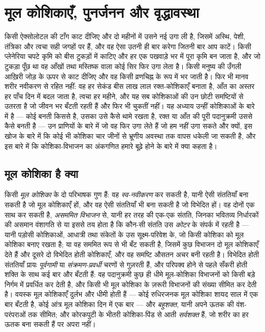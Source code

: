 \chapter{मूल कोशिकाएँ, पुनर्जनन और वृद्धावस्था}\label{ch:b3:stem-cells}

किसी ऐक्सोलोटल की टाँग काट दीजिए और दो महीनों में उसने नई उगा ली है,
जिसमें अस्थि, पेशी, तंत्रिका और त्वचा सही जगहों पर हैं, और वह ऐसा उतनी
ही बार करेगा जितनी बार आप काटें। किसी प्लेनेरिया चपटे कृमि को बीस
टुकड़ों में काटिए और हर एक पखवाड़े भर में पूरा कृमि बन जाता है, और जो
टुकड़ा पूँछ था वह आँखों तथा मस्तिष्क वाला कोई सिर फिर उगा लेता है। किसी
मनुष्य की उँगली आख़िरी जोड़ के ऊपर से काट दीजिए और वह किसी व्रणचिह्न के
रूप में भर जाती है। फिर भी मानव शरीर नवीकरण से रहित नहीं: वह हर सेकंड
बीस लाख लाल रक्त-कोशिकाएँ बनाता है, आँत का अस्तर हर पाँच दिन में बदल
जाता है, त्वचा हर महीने, और यह सब कोशिकाओं की उन छोटी समष्टियों से उतरता
है जो जीवन भर बँटती रहती हैं और फिर भी चुकतीं नहीं। यह अध्याय उन्हीं
कोशिकाओं के बारे में है --- कोई  बनती किससे है, उसका  उसे
कैसे थामे रखता है, रक्त या आँत की पूरी पदानुक्रमी उससे कैसे बनती है ---
उन प्राणियों के बारे में जो वह फिर उगा लेते हैं जो हम नहीं उगा सकते और
क्यों, इस खोज के बारे में कि कोई भी कोशिका चार जीनों से भ्रूणीय अवस्था
तक वापस धकेली जा सकती है, और इस बारे में कि कोशिका-विभाजन का अंकगणित
हमारे बूढ़े होने के बारे में क्या कहता है।

\section{मूल कोशिका है क्या}

\begin{definition}[मूल कोशिकाएँ और उनकी पदानुक्रमी]\label{def:b3:stem-cells:stem}
किसी \emph{मूल कोशिका} के दो परिभाषक गुण हैं: वह \emph{स्व-नवीकरण} कर
सकती है, यानी ऐसी संततियाँ बना सकती है जो मूल कोशिकाएँ हों, और वह ऐसी
संततियाँ भी बना सकती है जो विभेदित हों। वह दोनों एक साथ कर सकती है,
\emph{असममित विभाजन} से, यानी हर तरह की एक-एक संतति, जिनका भवितव्य
निर्धारकों की असमान वंशागति से या इससे तय होता है कि कौन-सी संतति उस
\emph{कोटर} के संपर्क में रहती है --- यानी पड़ोसी कोशिकाओं, आधात्री तथा
संकेतों के उस सूक्ष्म-परिवेश के, जो किसी कोशिका को मूल कोशिका बनाए रखता
है; या वह सममित रूप से भी बँट सकती है, जिसमें कुछ विभाजन दो मूल
कोशिकाएँ देते हैं और दूसरे दो विभेदित होती कोशिकाएँ, और वह समष्टि औसतन
अचर बनी रहती है। विभेदित होती संततियाँ प्रायः \emph{पूर्वगामी} या
\emph{संक्रमण-प्रवर्धी} चरणों से गुज़रती हैं, और परिपक्व होने से पहले
सँकरी होती शक्ति के साथ कई बार और बँटती हैं: वह पदानुक्रमी कुछ ही धीमे
मूल-कोशिका विभाजनों को किसी बड़े निर्गम में प्रवर्धित कर देती है, और
किसी भी मूल कोशिका के ज़रूरी विभाजनों की संख्या सीमित कर देती है। वयस्क
मूल कोशिकाएँ दुर्लभ और धीमी होती हैं --- कोई रुधिरजनक मूल कोशिका शायद
साल में एक बार बँटती है, कोई आंत्र मूल कोशिका दिन में एक बार --- और
\emph{बहुशक्त}, यानी अपने ऊतक की वंश-परंपराओं तक सीमित; और कोरकपुटी के
भीतरी कोशिका-पिंड से आती  \emph{सर्वशक्त} हैं, जो
शरीर का हर ऊतक बना सकती हैं पर अपरा नहीं।
\end{definition}

